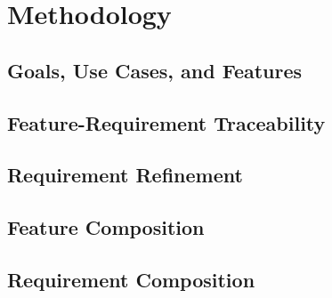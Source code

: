 \chapter{Methodology}

\section{Goals, Use Cases, and Features}

\section{Feature-Requirement Traceability}

\section{Requirement Refinement}

\section{Feature Composition}

\section{Requirement Composition}